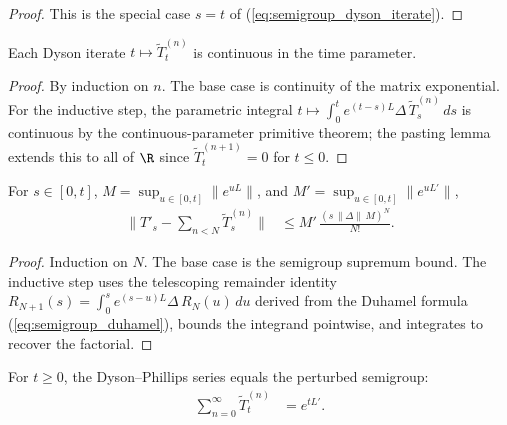 \begin{proof}
    \leanok
    This is the special case $s=t$ of
    (\ref{eq:semigroup_dyson_iterate}).
\end{proof}

\begin{theorem}
    \label{thm:dysonTerm_continuous_ch12}
    \leanok
    Each Dyson iterate $t \mapsto \widetilde{T}^{(n)}_t$ is continuous
    in the time parameter.
\end{theorem}

\begin{proof}
    \leanok
    By induction on $n$. The base case is continuity of the matrix
    exponential. For the inductive step, the parametric integral
    $t\mapsto \int_0^t e^{(t-s)L}\Delta\,\widetilde{T}^{(n)}_s\,ds$
    is continuous by the continuous-parameter primitive theorem;
    the pasting lemma extends this to all of $\R$ since
    $\widetilde{T}^{(n+1)}_t = 0$ for $t \le 0$.
\end{proof}

\begin{theorem}
    \label{thm:norm_dysonRemainder_le_ch12}
    \leanok
    For $s \in [0,t]$, $M = \sup_{u \in [0,t]}\|e^{uL}\|$,
    and $M' = \sup_{u \in [0,t]}\|e^{uL'}\|$,
    \begin{align}
        \bigl\|T'_s - \textstyle\sum_{n < N}\widetilde{T}^{(n)}_s\bigr\|
        &\le M'\,\frac{(s\,\|\Delta\|\,M)^N}{N!}.
        \label{eq:semigroup_dyson_remainder}
    \end{align}
\end{theorem}

\begin{proof}
    \leanok
    Induction on $N$. The base case is the semigroup supremum bound.
    The inductive step uses the telescoping remainder identity
    $R_{N+1}(s) = \int_0^s e^{(s-u)L}\Delta\,R_N(u)\,du$
    derived from the Duhamel formula (\ref{eq:semigroup_duhamel}), bounds
    the integrand pointwise, and integrates to recover the factorial.
\end{proof}

\begin{theorem}
    \label{thm:dyson_series_eq_ch12}
    \leanok
    For $t \ge 0$, the Dyson--Phillips series equals the perturbed
    semigroup:
    \begin{align}
        \sum_{n=0}^{\infty} \widetilde{T}^{(n)}_t
        &= e^{tL'}.
        \label{eq:semigroup_dyson_series}
    \end{align}
\end{theorem}

